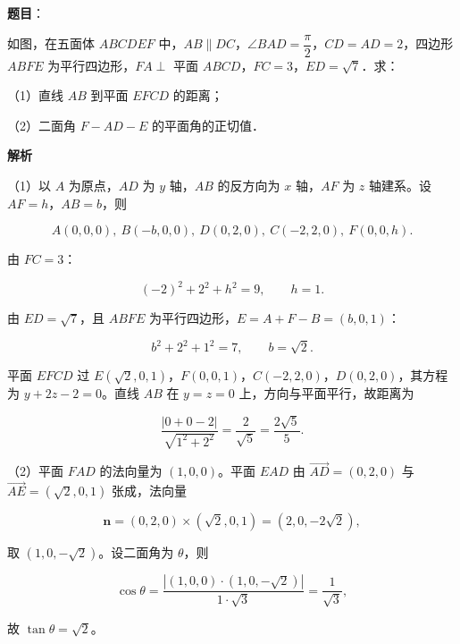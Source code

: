 \begin{answer}

\textbf{题目}：

如图，在五面体 $ABCDEF$ 中，$AB\parallel DC$，$\angle BAD=\dfrac\pi2$，$CD=AD=2$，四边形 $ABFE$ 为平行四边形，$FA\perp$ 平面 $ABCD$，$FC=3$，$ED=\sqrt7$．求：

（1）直线 $AB$ 到平面 $EFCD$ 的距离；

（2）二面角 $F-AD-E$ 的平面角的正切值．
\nopagebreak[4]
\begin{center}\end{center}
\nopagebreak[4]
\textbf{解析}

（1）以 $A$ 为原点，$AD$ 为 $y$ 轴，$AB$ 的反方向为 $x$ 轴，$AF$ 为 $z$ 轴建系。设 $AF=h$，$AB=b$，则

\nopagebreak[4]
\[A(0,0,0),\ B(-b,0,0),\ D(0,2,0),\ C(-2,2,0),\ F(0,0,h).\]

由 $FC=3$：

\nopagebreak[4]
\[(-2)^2+2^2+h^2=9,\qquad h=1.\]

由 $ED=\sqrt7$，且 $ABFE$ 为平行四边形，$E=A+F-B=(b,0,1)$：

\nopagebreak[4]
\[b^2+2^2+1^2=7,\qquad b=\sqrt2.\]

平面 $EFCD$ 过 $E(\sqrt2,0,1)$，$F(0,0,1)$，$C(-2,2,0)$，$D(0,2,0)$，其方程为 $y+2z-2=0$。直线 $AB$ 在 $y=z=0$ 上，方向与平面平行，故距离为

\nopagebreak[4]
\[\frac{|0+0-2|}{\sqrt{1^2+2^2}}=\frac2{\sqrt5}=\frac{2\sqrt5}5.\]

（2）平面 $FAD$ 的法向量为 $(1,0,0)$。平面 $EAD$ 由 $\overrightarrow{AD}=(0,2,0)$ 与 $\overrightarrow{AE}=(\sqrt2,0,1)$ 张成，法向量

\nopagebreak[4]
\[\boldsymbol n=(0,2,0)\times(\sqrt2,0,1)=(2,0,-2\sqrt2),\]

取 $(1,0,-\sqrt2)$。设二面角为 $\theta$，则

\nopagebreak[4]
\[\cos\theta=\frac{|(1,0,0)\cdot(1,0,-\sqrt2)|}{1\cdot\sqrt3}=\frac1{\sqrt3},\]

故 $\tan\theta=\sqrt2$。


\end{answer}

